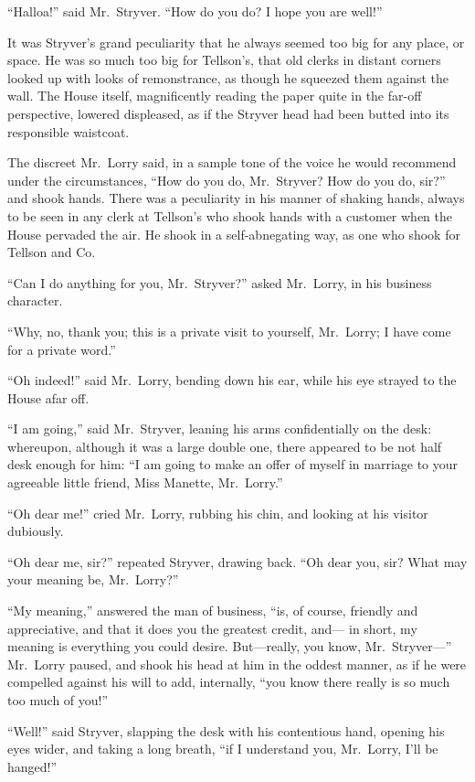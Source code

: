 ``Halloa!'' said Mr.\ Stryver.  ``How do you do?  I hope you are well!''

It was Stryver's grand peculiarity that he always seemed too big for
any place, or space.  He was so much too big for Tellson's, that
old clerks in distant corners looked up with looks of remonstrance,
as though he squeezed them against the wall.  The House itself,
magnificently reading the paper quite in the far-off perspective,
lowered displeased, as if the Stryver head had been butted into its
responsible waistcoat.

The discreet Mr.\ Lorry said, in a sample tone of the voice he would
recommend under the circumstances, ``How do you do, Mr.\ Stryver?
How do you do, sir?'' and shook hands.  There was a peculiarity in his
manner of shaking hands, always to be seen in any clerk at Tellson's
who shook hands with a customer when the House pervaded the air.
He shook in a self-abnegating way, as one who shook for Tellson and Co.

``Can I do anything for you, Mr.\ Stryver?'' asked Mr.\ Lorry, in his
business character.

``Why, no, thank you; this is a private visit to yourself, Mr.\ Lorry;
I have come for a private word.''

``Oh indeed!'' said Mr.\ Lorry, bending down his ear, while his eye
strayed to the House afar off.

``I am going,'' said Mr.\ Stryver, leaning his arms confidentially on the
desk:  whereupon, although it was a large double one, there appeared to
be not half desk enough for him:  ``I am going to make an offer of myself
in marriage to your agreeable little friend, Miss Manette, Mr.\ Lorry.''

``Oh dear me!'' cried Mr.\ Lorry, rubbing his chin, and looking at his
visitor dubiously.

``Oh dear me, sir?'' repeated Stryver, drawing back.  ``Oh dear you, sir?
What may your meaning be, Mr.\ Lorry?''

``My meaning,'' answered the man of business, ``is, of course, friendly
and appreciative, and that it does you the greatest credit, and---%
in short, my meaning is everything you could desire.  But---really, you
know, Mr.\ Stryver---'' Mr.\ Lorry paused, and shook his head at him in
the oddest manner, as if he were compelled against his will to add,
internally, ``you know there really is so much too much of you!''

``Well!'' said Stryver, slapping the desk with his contentious hand,
opening his eyes wider, and taking a long breath, ``if I understand
you, Mr.\ Lorry, I'll be hanged!''

